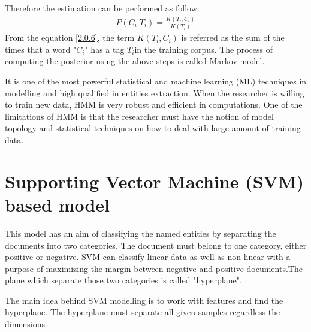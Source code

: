 Therefore the estimation can be performed as follow:
\begin{align}
P(C_{i}|T_{i}) =  \frac{K(T_{i},C_{i})}{K(T_{i})} \label{2.0.6}
\end{align}
From the equation \eqref{2.0.6}, the term $K(T_{i},C_{i})$  is referred as the sum of the times that a word "$C_{i}$" has a tag $T_{i}$in the training corpus.
The process of computing the posterior using the above steps is called Markov model.


It is one of the most powerful statistical and machine learning (ML) techniques in modelling and high qualified in entities extraction. When the researcher is willing to train new data, HMM is very robust and efficient in computations.
One of the limitations of HMM is that the researcher must have the notion of model topology and statistical techniques on how to deal with large amount of training data.
\section{Supporting Vector Machine (SVM) based model}
This model has an aim of classifying the named entities by separating the documents into two categories.  The document must belong to one category, either positive or negative.  SVM can classify linear data as well as non linear with a purpose of maximizing the margin between negative and positive documents.The plane which separate those two categories is called "hyperplane".

The main idea behind SVM modelling is to work with features and find the hyperplane. The hyperplane must separate all given samples regardless the dimensions.
